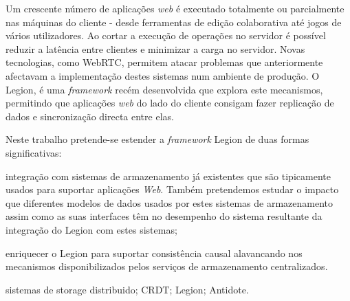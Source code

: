Um crescente número de aplicações \textit{web} é executado totalmente ou parcialmente nas máquinas do cliente - desde ferramentas de edição colaborativa até jogos de vários utilizadores. Ao cortar a execução de operações no servidor é possível reduzir a latência entre clientes e minimizar a carga no servidor. Novas tecnologias, como WebRTC, permitem atacar problemas que anteriormente afectavam a implementação destes sistemas num ambiente de produção. O Legion, é uma \textit{framework} recém desenvolvida que explora este mecanismos, permitindo que aplicações \textit{web} do lado do cliente consigam fazer replicação de dados e sincronização directa entre elas.\par
	Neste trabalho pretende-se estender a \textit{framework} Legion de duas formas significativas: \begin{enumerate*}[(i)]
	\item integração com sistemas de armazenamento já existentes que são tipicamente usados para suportar aplicações \textit{Web}. Também pretendemos estudar o impacto que diferentes modelos de dados usados por estes sistemas de armazenamento assim como as suas interfaces têm no desempenho do sistema resultante da integração do Legion com estes sistemas;
	\item enriquecer o Legion para suportar consistência causal alavancando nos mecanismos disponibilizados pelos serviços de armazenamento centralizados.
\end{enumerate*}

\begin{keywords}
sistemas de storage distribuido; CRDT; Legion; Antidote.
\end{keywords}
